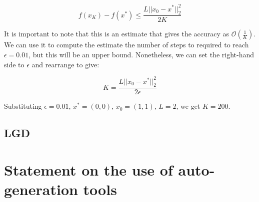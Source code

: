 \documentclass[12pt]{article}
\begin{document}
\[f(x_K) - f(x^*) \leq \frac{L||x_0-x^*||_2^2}{2K}\]

It is important to note that this is an estimate that gives the accuracy as $\mathcal{O}(\frac{1}{K})$.
We can use it to compute the estimate the number of steps to required to reach $\epsilon=0.01$,
but this will be an upper bound.
Nonetheless, we can set the right-hand side to $\epsilon$ and rearrange to give:

\[K = \frac{L||x_0-x^*||_2^2}{2\epsilon}\]

Substituting $\epsilon=0.01$, $x^*=(0,0)$, $x_0=(1,1)$, $L=2$, we get $K=200$.



\subsection{LGD}






\appendix

\section{Statement on the use of auto-generation tools}
\end{document}
